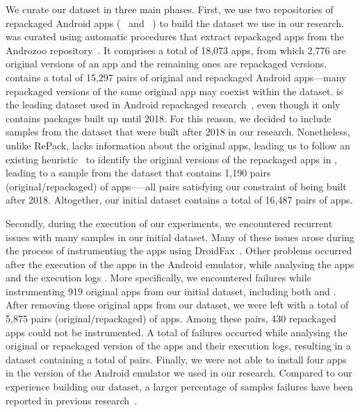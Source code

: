 We curate our dataset in three main phases. 
First, we use two repositories of repackaged Android apps (\repack~\cite{DBLP:journals/tse/LiBK21} and \amc~\cite{rafiq2022andromalpack}) to build the
dataset we use in our research. \repack was curated using automatic procedures that extract repackaged apps from the Androzoo
repository~\cite{DBLP:conf/msr/AllixBKT16}. It comprises a total of 18,073 apps, from which 2,776 are original versions of an app and the remaining ones are repackaged versions. \repack contains a total of 15,297 pairs of original and repackaged Android
apps---many repackaged versions of the same original app may coexist within the \repack dataset. \repack is the leading dataset used in Android
repackaged research~\cite{DBLP:journals/ese/KhanmohammadiEH19}, even though it only contains packages built up until 2018. For this reason, we decided to include samples from the \amc
dataset that were built after 2018 in our research. Nonetheless, unlike RePack, \amc lacks information about the original apps, leading
us to follow an existing heuristic~\cite{DBLP:journals/tse/LiBK21} to identify the original versions of the repackaged apps in \amc,
leading to a sample from the \amc dataset that contains 1,190 pairs (original/repackaged) of apps—--all pairs
satisfying our constraint of being built after 2018. Altogether, our initial dataset contains a total of 16,487 pairs of apps.


Secondly, during the execution of our experiments, we encountered recurrent issues with many samples in our initial dataset. Many of these issues arose during the process of instrumenting the apps using DroidFax~\cite{DBLP:conf/icsm/CaiR17a}.
Other problems occurred after the execution of the apps in the Android emulator, while analysing the apps and the execution logs .
More specifically, we encountered failures while instrumenting 919 original apps from our initial dataset, including both \repack and \amc. After removing these original apps
from our dataset, we were left with a total of 5,875 pairs (original/repackaged) of apps. Among these pairs, 430 repackaged apps could not be instrumented.
A total of  failures occurred while analysing the original or repackaged version of the apps and their execution logs, resulting in a dataset containing a total of  pairs.
Finally, we were not able to install four apps in the version of the Android emulator we used in our research.
Compared to our experience building our dataset, a larger percentage of samples failures have been reported in previous research~\cite{DBLP:conf/wcre/BaoLL18}.


